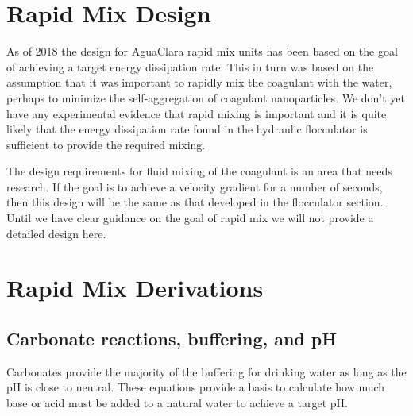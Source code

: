 \documentclass[letterpaper,10pt,english]{sphinxmanual}
\begin{document}
\chapter{Rapid Mix Design}
\label{\detokenize{Rapid_Mix/RM_Design:rapid-mix-design}}\label{\detokenize{Rapid_Mix/RM_Design:title-rapid-mix-design}}\label{\detokenize{Rapid_Mix/RM_Design::doc}}
As of 2018 the design for AguaClara rapid mix units has been based on the goal of achieving a target energy dissipation rate. This in turn was based on the assumption that it was important to rapidly mix the coagulant with the water, perhaps to minimize the self-aggregation of coagulant nanoparticles. We don’t yet have any experimental evidence that rapid mixing is important and it is quite likely that the energy dissipation rate found in the hydraulic flocculator is sufficient to provide the required mixing.

The design requirements for fluid mixing of the coagulant is an area that needs research. If the goal is to achieve a velocity gradient for a number of seconds, then this design will be the same as that developed in the flocculator section. Until we have clear guidance on the goal of rapid mix we will not provide a detailed design here.


\chapter{Rapid Mix Derivations}
\label{\detokenize{Rapid_Mix/RM_Derivations:rapid-mix-derivations}}\label{\detokenize{Rapid_Mix/RM_Derivations:title-rapid-mix-derivations}}\label{\detokenize{Rapid_Mix/RM_Derivations::doc}}

\section{Carbonate reactions, buffering, and pH}
\label{\detokenize{Rapid_Mix/RM_Derivations:carbonate-reactions-buffering-and-ph}}\label{\detokenize{Rapid_Mix/RM_Derivations:heading-carbonate-reactions-buffering-and-ph}}
Carbonates provide the majority of the buffering for drinking water as long as the pH is close to neutral. These equations provide a basis to calculate how much base or acid must be added to a natural water to achieve a target pH.
\end{document}
